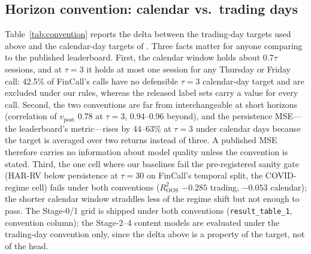 \subsection{Horizon convention: calendar vs.\ trading days}
\label{sec:results-convention}
Table~\ref{tab:convention} reports the delta between the trading-day targets used
above and the calendar-day targets of \citet{qin2019what}. Three facts matter for
anyone comparing to the published leaderboard. First, the calendar window holds
about $0.7\tau$ sessions, and at $\tau{=}3$ it holds at most one session for any
Thursday or Friday call: 42.5\% of FinCall's calls have no defensible $\tau{=}3$
calendar-day target and are excluded under our rules, whereas the released label
sets carry a value for every call. Second, the two conventions are far from
interchangeable at short horizons (correlation of $v_{\mathrm{post}}$ 0.78 at
$\tau{=}3$, 0.94--0.96 beyond), and the persistence MSE---the leaderboard's
metric---rises by 44--63\% at $\tau{=}3$ under calendar days because the target is
averaged over two returns instead of three. A published MSE therefore carries no
information about model quality unless the convention is stated. Third, the
one cell where our baselines fail the pre-registered sanity gate (HAR-RV below
persistence at $\tau{=}30$ on FinCall's temporal split, the COVID-regime cell)
fails under both conventions ($R^2_{\mathrm{OOS}}$ $-0.285$ trading, $-0.053$
calendar); the shorter calendar window straddles less of the regime shift but not
enough to pass. The Stage-0/1 grid is shipped under both
conventions (\texttt{result\_table\_1}, convention column); the Stage-2--4
content models are evaluated under the trading-day convention only, since the
delta above is a property of the target, not of the head.



